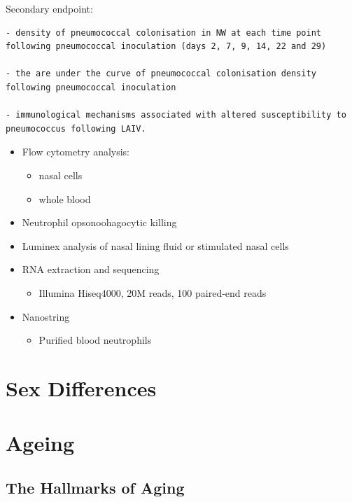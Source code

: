\documentclass[
]{book}
\providecommand{\tightlist}{%
  \setlength{\itemsep}{0pt}\setlength{\parskip}{0pt}}
\begin{document}
Secondary endpoint:

\begin{verbatim}
- density of pneumococcal colonisation in NW at each time point following pneumococcal inoculation (days 2, 7, 9, 14, 22 and 29)

- the are under the curve of pneumococcal colonisation density following pneumococcal inoculation

- immunological mechanisms associated with altered susceptibility to pneumococcus following LAIV.
\end{verbatim}

\begin{itemize}
\item
  Flow cytometry analysis:

  \begin{itemize}
  \item
    nasal cells
  \item
    whole blood
  \end{itemize}
\item
  Neutrophil opsonoohagocytic killing
\item
  Luminex analysis of nasal lining fluid or stimulated nasal cells
\item
  RNA extraction and sequencing

  \begin{itemize}
  \tightlist
  \item
    Illumina Hiseq4000, 20M reads, 100 paired-end reads
  \end{itemize}
\item
  Nanostring

  \begin{itemize}
  \tightlist
  \item
    Purified blood neutrophils
  \end{itemize}
\end{itemize}

\hypertarget{sex-differences-1}{%
\chapter{Sex Differences}\label{sex-differences-1}}

\hypertarget{ageing-1}{%
\chapter{Ageing}\label{ageing-1}}

\hypertarget{the-hallmarks-of-aging}{%
\section{The Hallmarks of Aging}\label{the-hallmarks-of-aging}}
\end{document}
